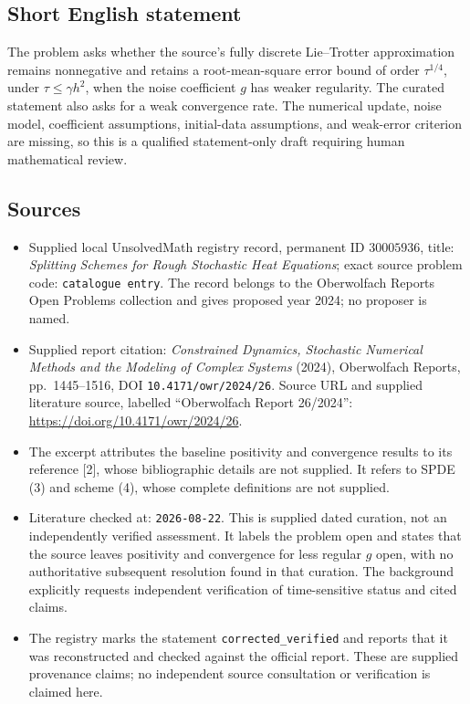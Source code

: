 \documentclass[11pt]{article}
\begin{document}
\subsection{Short English statement}
The problem asks whether the source's fully discrete Lie--Trotter approximation remains nonnegative and retains a root-mean-square error bound of order \(\tau^{1/4}\), under \(\tau\leq\gamma h^2\), when the noise coefficient \(g\) has weaker regularity. The curated statement also asks for a weak convergence rate. The numerical update, noise model, coefficient assumptions, initial-data assumptions, and weak-error criterion are missing, so this is a qualified statement-only draft requiring human mathematical review.
\subsection{Sources}
\begin{itemize}
\item Supplied local UnsolvedMath registry record, permanent ID \(30005936\), title: \emph{Splitting Schemes for Rough Stochastic Heat Equations}; exact source problem code: \texttt{catalogue entry}. The record belongs to the Oberwolfach Reports Open Problems collection and gives proposed year 2024; no proposer is named.
\item Supplied report citation: \emph{Constrained Dynamics, Stochastic Numerical Methods and the Modeling of Complex Systems} (2024), Oberwolfach Reports, pp.\ 1445--1516, DOI \texttt{10.4171/owr/2024/26}. Source URL and supplied literature source, labelled ``Oberwolfach Report 26/2024'': \url{https://doi.org/10.4171/owr/2024/26}.
\item The excerpt attributes the baseline positivity and convergence results to its reference [2], whose bibliographic details are not supplied. It refers to SPDE (3) and scheme (4), whose complete definitions are not supplied.
\item Literature checked at: \texttt{2026-08-22}. This is supplied dated curation, not an independently verified assessment. It labels the problem open and states that the source leaves positivity and convergence for less regular \(g\) open, with no authoritative subsequent resolution found in that curation. The background explicitly requests independent verification of time-sensitive status and cited claims.
\item The registry marks the statement \texttt{corrected\_verified} and reports that it was reconstructed and checked against the official report. These are supplied provenance claims; no independent source consultation or verification is claimed here.
\end{itemize}
\end{document}
